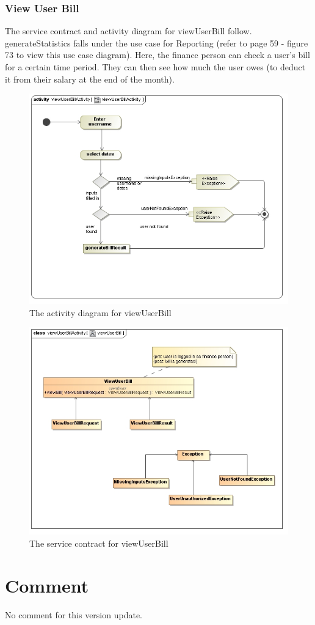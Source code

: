 \documentclass[a4paper,12pt]{report}
\begin{document}
\subsubsection{View User Bill }
The service contract and activity diagram for viewUserBill follow. generateStatistics falls under the use case for Reporting (refer to page 59 - figure 73 to view this use case diagram). Here, the finance person can check a user's bill for a certain time period. They can then see how much the user owes (to deduct it from their salary at the end of the month).

\begin{figure}[H]
  \centering
    \includegraphics[width=1.0\textwidth]{../images/viewUserBillActivity.jpg}
    \caption{The activity diagram for viewUserBill} 
\end{figure}
\begin{figure}[H]
  \centering
    \includegraphics[width=1.0\textwidth]{../images/viewUserBill.jpg}
    \caption{The service contract for viewUserBill} 
\end{figure}

\section{Comment}
No comment for this version update.
\end{document}
